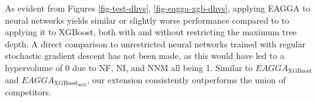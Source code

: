 \documentclass[twoside,11pt]{article}
\begin{document}
\begin{figure}
  \centering
\end{figure}
As evident from Figures \ref{fig-test-dhvs}, \ref{fig-eagga-xgb-dhvs}, applying EAGGA to neural networks yields similar or slightly worse performance compared to
to applying it to XGBoost, both with and without restricting the maximum tree depth.
A direct comparison to unrestricted neural networks trained with regular stochastic gradient descent has not been made, as this would have led to a hypervolume of 0
due to NF, NI, and NNM all being 1.
Similar to $EAGGA_{\text{XGBoost}}$ and $EAGGA_{\text{XGBoost}_{\text{md2}}}$, our extension consistently outperforms the union of competitors.
\end{document}
